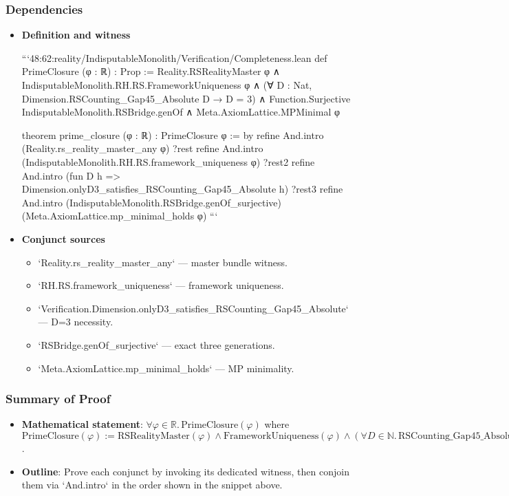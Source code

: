 \documentclass{article}
\begin{document}
\subsubsection{Dependencies}
\begin{itemize}[leftmargin=*]
  \item \textbf{Definition and witness}

```48:62:reality/IndisputableMonolith/Verification/Completeness.lean
def PrimeClosure (φ : ℝ) : Prop :=
  Reality.RSRealityMaster φ ∧
  IndisputableMonolith.RH.RS.FrameworkUniqueness φ ∧
  (∀ D : Nat, Dimension.RSCounting_Gap45_Absolute D → D = 3) ∧
  Function.Surjective IndisputableMonolith.RSBridge.genOf ∧
  Meta.AxiomLattice.MPMinimal φ

theorem prime_closure (φ : ℝ) : PrimeClosure φ := by
  refine And.intro (Reality.rs_reality_master_any φ) ?rest
  refine And.intro (IndisputableMonolith.RH.RS.framework_uniqueness φ) ?rest2
  refine And.intro (fun D h => Dimension.onlyD3_satisfies_RSCounting_Gap45_Absolute h) ?rest3
  refine And.intro (IndisputableMonolith.RSBridge.genOf_surjective) (Meta.AxiomLattice.mp_minimal_holds φ)
```

  \item \textbf{Conjunct sources}
  \begin{itemize}
    \item `Reality.rs\_reality\_master\_any` — master bundle witness.
    \item `RH.RS.framework\_uniqueness` — framework uniqueness.
    \item `Verification.Dimension.onlyD3\_satisfies\_RSCounting\_Gap45\_Absolute` — D=3 necessity.
    \item `RSBridge.genOf\_surjective` — exact three generations.
    \item `Meta.AxiomLattice.mp\_minimal\_holds` — MP minimality.
  \end{itemize}
\end{itemize}

\subsubsection{Summary of Proof}
\begin{itemize}[leftmargin=*]
  \item \textbf{Mathematical statement}: \(\forall \varphi\in\mathbb{R}.\,\mathrm{PrimeClosure}(\varphi)\) where
    \(\mathrm{PrimeClosure}(\varphi) := \mathrm{RSRealityMaster}(\varphi) \land \mathrm{FrameworkUniqueness}(\varphi)
    \land (\forall D\in\mathbb{N}.\,\mathrm{RSCounting\_Gap45\_Absolute}(D) \to D=3) \land \mathrm{Surj}(\mathrm{genOf}) \land \mathrm{MPMinimal}(\varphi)\).
  \item \textbf{Outline}: Prove each conjunct by invoking its dedicated witness, then conjoin them via `And.intro` in the order shown in the snippet above.
\end{itemize}
\end{document}
